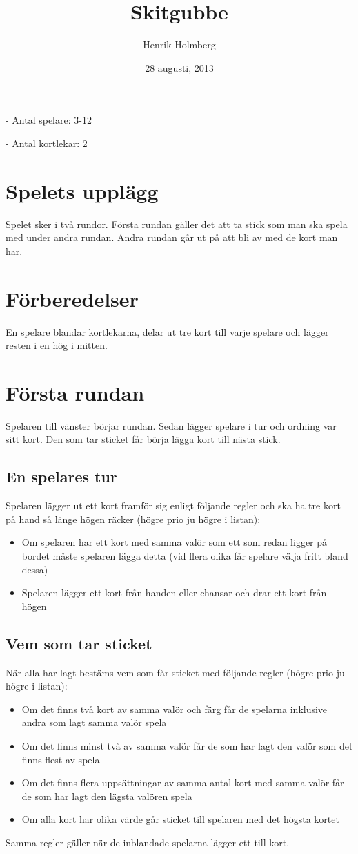 \documentclass[a4paper,12pt]{article}
\title{Skitgubbe}
\date{28 augusti, 2013}
\author{Henrik Holmberg}
\begin{document}
\maketitle

- Antal spelare: 3-12

- Antal kortlekar: 2

\section{Spelets upplägg}
Spelet sker i två rundor.
Första rundan gäller det att ta stick som man ska spela med under andra rundan.
Andra rundan går ut på att bli av med de kort man har.

\section{Förberedelser}
En spelare blandar kortlekarna, delar ut tre kort till varje spelare och lägger resten i en hög i mitten.

\section{Första rundan}
Spelaren till vänster börjar rundan. Sedan lägger spelare i tur och ordning var sitt kort. Den som tar sticket får börja lägga kort till nästa stick.

\subsection{En spelares tur}
Spelaren lägger ut ett kort framför sig enligt följande regler och ska ha tre kort på hand så länge högen räcker (högre prio ju högre i listan):
\begin{itemize}
  \item Om spelaren har ett kort med samma valör som ett som redan ligger på bordet måste spelaren lägga detta (vid flera olika får spelare välja fritt bland dessa)
  \item Spelaren lägger ett kort från handen eller chansar och drar ett kort från högen
\end{itemize}

\subsection{Vem som tar sticket}
När alla har lagt bestäms vem som får sticket med följande regler (högre prio ju högre i listan):
\begin{itemize}
  \item Om det finns två kort av samma valör och färg får de spelarna inklusive andra som lagt samma valör spela
  \item Om det finns minst två av samma valör får de som har lagt den valör som det finns flest av spela
  \item Om det finns flera uppsättningar av samma antal kort med samma valör får de som har lagt den lägsta valören spela
  \item Om alla kort har olika värde går sticket till spelaren med det högsta kortet
\end{itemize}
Samma regler gäller när de inblandade spelarna lägger ett till kort.
\end{document}
